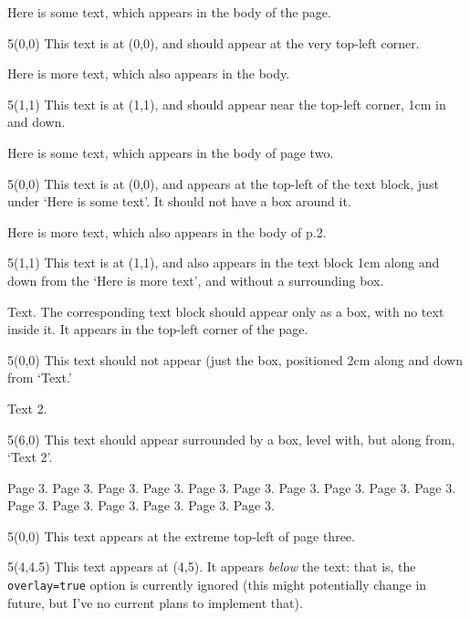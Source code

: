 \documentclass{article}
\begin{document}
Here is some text, which appears in the body of the page.
\begin{textblock}{5}(0,0)
This text is at (0,0), and should appear at the very top-left corner.
\end{textblock}

Here is more text, which also appears in the body.
\begin{textblock}{5}(1,1)
This text is at (1,1), and should appear near the top-left corner, 1cm
in and down.
\end{textblock}

\newpage
{}

Here is some text, which appears in the body of page two.
\begin{textblock}{5}(0,0)
This text is at (0,0), and appears at the top-left of the text block,
just under `Here is some text'.
It should not have a box around it.
\end{textblock}

\vskip4cm
Here is more text, which also appears in the body of p.2.
\begin{textblock}{5}(1,1)
This text is at (1,1), and also appears in the text block 1cm along
and down from the `Here is more text', and without a surrounding box.
\end{textblock}


\vskip4cm
Text.  The corresponding text block should appear only as a box, with
no text inside it.  It appears in the top-left corner of the page.
\begin{textblock}{5}(0,0)
This text should not appear (just the box, positioned 2cm along and
down from `Text.'
\end{textblock}


\vskip4cm
Text 2.
\begin{textblock}{5}(6,0)
This text should appear surrounded by a box, level with, but along from, `Text 2'.
\end{textblock}

\newpage
{} %

Page 3.  Page 3.  Page 3.  Page 3.  Page 3.  Page 3.  Page 3.  Page 3.
Page 3.  Page 3.  Page 3.  Page 3.  Page 3.  Page 3.  Page 3.  Page 3.

\begin{textblock}{5}(0,0)
This text appears at the extreme top-left of page three.
\end{textblock}

\begin{textblock}{5}(4,4.5)
  This text appears at (4,5).  It appears \emph{below} the text: that
  is, the \texttt{overlay=true} option is currently ignored (this
  might potentially change in future, but I've no current plans to
  implement that).
\end{textblock}
\end{document}
